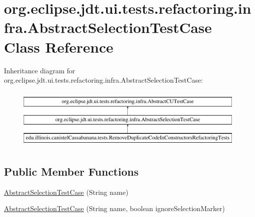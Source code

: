 \hypertarget{classorg_1_1eclipse_1_1jdt_1_1ui_1_1tests_1_1refactoring_1_1infra_1_1AbstractSelectionTestCase}{
\section{org.eclipse.jdt.ui.tests.refactoring.infra.AbstractSelectionTestCase Class Reference}
\label{classorg_1_1eclipse_1_1jdt_1_1ui_1_1tests_1_1refactoring_1_1infra_1_1AbstractSelectionTestCase}
}
Inheritance diagram for org.eclipse.jdt.ui.tests.refactoring.infra.AbstractSelectionTestCase:\begin{figure}[H]
\begin{center}
\leavevmode
\includegraphics[height=3.000000cm]{classorg_1_1eclipse_1_1jdt_1_1ui_1_1tests_1_1refactoring_1_1infra_1_1AbstractSelectionTestCase}
\end{center}
\end{figure}
\subsection*{Public Member Functions}
\begin{DoxyCompactItemize}
\item 
\hyperlink{classorg_1_1eclipse_1_1jdt_1_1ui_1_1tests_1_1refactoring_1_1infra_1_1AbstractSelectionTestCase_a603bdc23109cc1adba274af4a2b339d5}{AbstractSelectionTestCase} (String name)
\item 
\hyperlink{classorg_1_1eclipse_1_1jdt_1_1ui_1_1tests_1_1refactoring_1_1infra_1_1AbstractSelectionTestCase_ab91e1c56973904a647aa740708b69683}{AbstractSelectionTestCase} (String name, boolean ignoreSelectionMarker)
\end{DoxyCompactItemize}
